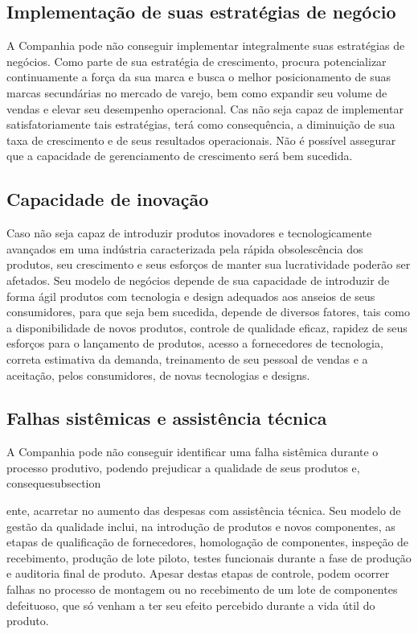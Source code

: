 {\subsection{Implementação de suas estratégias de negócio}
A Companhia pode não conseguir implementar integralmente suas estratégias de negócios. Como parte de sua estratégia de crescimento, procura potencializar continuamente a força da sua marca e busca o melhor posicionamento de suas marcas secundárias no mercado de varejo, bem como expandir seu volume de vendas e elevar seu desempenho operacional. Cas não seja capaz de implementar satisfatoriamente tais estratégias, terá como consequência, a diminuição de sua taxa de crescimento e de seus resultados operacionais. Não é possível assegurar que a capacidade de gerenciamento de crescimento será bem sucedida. 

\subsection{Capacidade de inovação}
Caso não seja capaz de introduzir produtos inovadores e tecnologicamente avançados em uma indústria caracterizada pela rápida obsolescência dos produtos, seu crescimento e seus esforços de manter sua lucratividade poderão ser afetados. Seu modelo de negócios depende de sua capacidade de introduzir de forma ágil produtos com tecnologia e design adequados aos anseios de seus consumidores, para que seja bem sucedida, depende de diversos fatores, tais como a disponibilidade de novos produtos, controle de qualidade eficaz, rapidez de seus esforços para o lançamento de produtos, acesso a fornecedores de tecnologia, correta estimativa da demanda, treinamento de seu pessoal de vendas e a aceitação, pelos consumidores, de novas tecnologias e designs. 

\subsection{Falhas sistêmicas e assistência técnica} 
A Companhia pode não conseguir identificar uma falha sistêmica durante o processo produtivo, podendo prejudicar a qualidade de seus produtos e, consequesubsection{ente, acarretar no aumento das despesas com assistência técnica. Seu modelo de gestão da qualidade inclui, na introdução de produtos e novos componentes, as etapas de qualificação de fornecedores, homologação de componentes, inspeção de recebimento, produção de lote piloto, testes funcionais durante a fase de produção e auditoria final de produto. Apesar destas etapas de controle, podem ocorrer falhas no processo de montagem ou no recebimento de um lote de componentes defeituoso, que só venham a ter seu efeito percebido durante a vida útil do produto. 

}}
